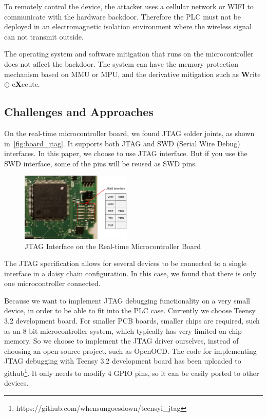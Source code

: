 To remotely control the device, the attacker uses a cellular network or WIFI to communicate with the hardware backdoor. Therefore the PLC must not be deployed in an electromagnetic isolation environment where the wireless signal can not transmit outside.

The operating system and software mitigation that runs on the microcontroller does not affect the backdoor.  The system can have the memory protection mechanism based on MMU or MPU, and the derivative mitigation such as \textbf{W}rite $\oplus$ e\textbf{X}ecute.



\subsection{Challenges and Approaches }

On the real-time microcontroller board, we found JTAG solder joints, as shown in~\autoref{fig:board_jtag}. It supports both JTAG and SWD (Serial Wire Debug\cite{ashfieldserial}) interfaces. In this paper, we choose to use JTAG interface. But if you use the SWD interface, some of the pins will be reused as SWD pins. 

\begin{figure}[th]
	\includegraphics[width=0.47\textwidth]{figures/board_jtag}
	\centering
	\caption{JTAG Interface on the Real-time Microcontroller Board}
	\label{fig:board_jtag}
\end{figure}

The JTAG specification allows for several devices to be connected to a single interface in a daisy chain configuration. In this case, we found that there is only one microcontroller connected.

Because we want to implement JTAG debugging functionality on a very small device, in order to be able to fit into the PLC case. Currently we choose Teensy 3.2 development board. For smaller PCB boards, smaller chips are required, such as an 8-bit microcontroller system, which typically has very limited on-chip memory. So we choose to implement the JTAG driver ourselves, instead of choosing an open source project, such as OpenOCD\cite{hogl2006open}. The code for implementing JTAG debugging with Teensy 3.2 development board has been uploaded to github\footnote{https://github.com/whensungoesdown/teensyi\_jtag}. It only needs to modify 4 GPIO pins, so it can be easily ported to other devices.

